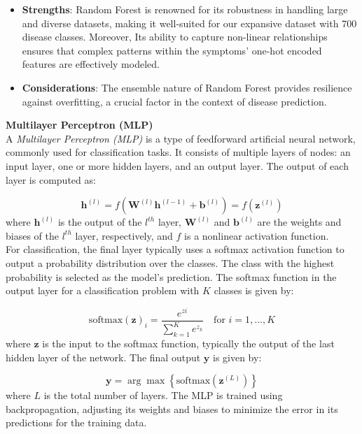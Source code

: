 \begin{itemize}
	\item \textbf{Strengths}: Random Forest is renowned for its robustness in handling large and diverse datasets, making
	      it well-suited for our expansive dataset with 700 disease classes. Moreover, Its ability to capture non-linear relationships
	      ensures that complex patterns within the symptoms' one-hot encoded features are effectively modeled.
	\item \textbf{Considerations}: The ensemble nature of Random Forest provides resilience against overfitting, a crucial factor
	      in the context of disease prediction.
\end{itemize}

\noindent
\vspace{0.3cm}
\textbf{Multilayer Perceptron (MLP)}\vspace{0.15cm}\\
A \textit{Multilayer Perceptron (MLP)} is a type of feedforward artificial neural network, commonly used for classification tasks. It consists of multiple layers of nodes: an input layer, one or more hidden layers, and an output layer. The output of each layer is computed as:

\begin{equation}
    \mathbf{h}^{(l)} = f(\mathbf{W}^{(l)} \mathbf{h}^{(l-1)} + \mathbf{b}^{(l)}) = f(\mathbf{z}^{(l)})
\end{equation}
\noindent
where $\mathbf{h}^{(l)}$ is the output of the $l^{th}$ layer, $\mathbf{W}^{(l)}$ and $\mathbf{b}^{(l)}$ are the weights and biases of the $l^{th}$ layer, respectively, and $f$ is a nonlinear activation function.\\
For classification, the final layer typically uses a softmax activation function to output a probability distribution over the classes. The class with the highest probability is selected as the model's prediction. The softmax function in the output layer for a classification problem with $K$ classes is given by:

\begin{equation}
    \text{softmax}(\mathbf{z})_i = \frac{e^{zi}}{\sum_{k=1}^{K} e^{z_k}} \quad \text{for } i = 1, \ldots, K
\end{equation}
\noindent
where $\mathbf{z}$ is the input to the softmax function, typically the output of the last hidden layer of the network. The final output $\mathbf{y}$ is given by:

\begin{equation}
	\mathbf{y} = \arg\max \left\{ \text{softmax}(\mathbf{z}^{(L)}) \right\}
\end{equation}
\noindent
where $L$ is the total number of layers. The MLP is trained using backpropagation, adjusting its weights and biases to minimize the error in its predictions for the training data.


